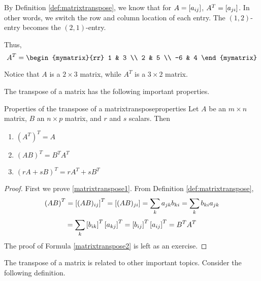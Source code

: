 \begin{solution}
By Definition \ref{def:matrixtranspose}, we know that for $A = \left[a_{ij} \right]$, 
$A^T = \left[a_{ji} \right]$. In other words, we switch the row and column
location of each entry. The $\left( 1, 2 \right)$-entry becomes the $\left( 2,1 \right)$-entry.

Thus, 
\begin{equation*}
A^T = 
 \begin{mymatrix}{rr}
1 & 3 \\
2 & 5 \\
-6 & 4
\end{mymatrix} 
\end{equation*}

Notice that $A$ is a $2 \times 3$ matrix, while $A^T$ is a $3 \times 2$ matrix. 
\end{solution}

The transpose of a matrix has the following important properties.

\begin{lemma}{Properties of the transpose of a matrix}{transposeproperties}
Let $A$ be an $m\times n$ matrix, $B$ an $n\times p$ matrix, and $r$ and $s$ scalars. Then
\begin{enumerate}
\item
$\left(A^{T}\right)^{T} = A$
\item
$\left( AB\right) ^{T}=B^{T}A^{T} $ \label{matrixtranspose1}
\item
$\left( rA+ sB\right) ^{T}=rA^{T}+ sB^{T}$  \label{matrixtranspose2}
\end{enumerate}
\end{lemma}

\begin{proof}
First we prove \ref{matrixtranspose1}. From Definition \ref{def:matrixtranspose},
\begin{equation*}
\left(AB\right)^{T} = \left[(AB) _{ij} \right] ^{T}=\left[(AB)_{ji} \right]=\sum_{k}a_{jk}b_{ki}= \sum_{k}b_{ki}a_{jk} 
\end{equation*}
\begin{equation*}
= \sum_{k}\left[b_{ik}\right]^{T}\left[
a_{kj}\right]^{T}=\left[b_{ij}\right] ^{T} \left[a_{ij}\right]^{T} = B^{T}A^{T} 
\end{equation*}
The proof of Formula \ref{matrixtranspose2} is left as an exercise. 
\end{proof}

The transpose of a matrix is related to other important topics. Consider the following definition.  

